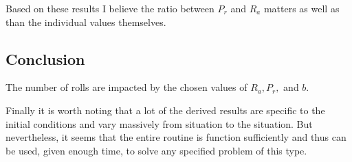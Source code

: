 \documentclass{article}
\begin{document}
Based on these results I believe the ratio between $P_r$ and $R_a$ matters as well as than the individual values themselves.

\subsection{Conclusion}

The number of rolls are impacted by the chosen values of $R_a, P_r,$ and $b$.

Finally it is worth noting that a lot of the derived results are specific to the initial conditions and vary massively from situation to the situation. But nevertheless, it seems that the entire routine is function sufficiently and thus can be used, given enough time, to solve any specified problem of this type. 
\end{document}
